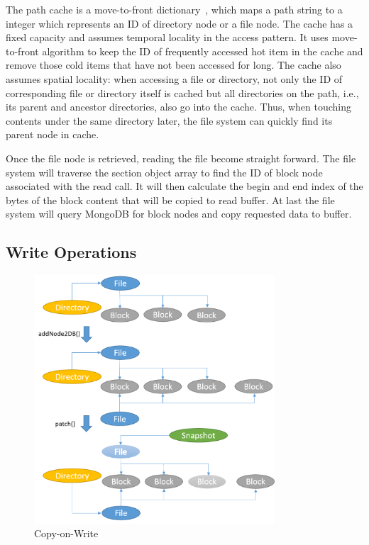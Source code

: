     The path cache is a move-to-front dictionary~\cite{mtf}, which maps a path string to a integer which represents an ID of directory node or a file node. The cache has a fixed capacity and assumes temporal locality in the access pattern. It uses move-to-front algorithm to keep the ID of frequently accessed hot item in the cache and remove those cold items that have not been accessed for long. The cache also assumes spatial locality: when accessing a file or directory, not only the ID of corresponding file or directory itself is cached but all directories on the path, i.e., its parent and ancestor directories, also go into the cache. Thus, when touching contents under the same directory later, the file system can quickly find its parent node in cache.

    Once the file node is retrieved, reading the file become straight forward. The file system will traverse the section object array to find the ID of block node associated with the read call. It will then calculate the begin and end index of the bytes of the block content that will be copied to read buffer. At last the file system will query MongoDB for block nodes and copy requested data to buffer.

\subsection{Write Operations}

\begin{figure}[t]
\centering
\includegraphics[width=0.8\textwidth]{Chapter-3/figs/fig10.png}
\caption{Copy-on-Write}
\label{fig:cow}
\end{figure}

